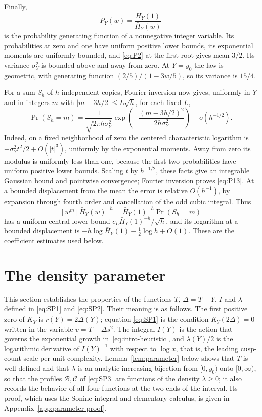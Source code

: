 Finally, \begin{equation}
P_Y(w)=\frac{\bar H_Y(1)}{\bar H_Y(w)}              \label{eq:P12}
\end{equation} is the probability generating function of a nonnegative integer
variable. Its probabilities at zero and one have uniform positive lower
bounds, its exponential moments are uniformly bounded, and \eqref{eq:P2} at the
first root gives mean \(3/2\). Its variance \(\sigma_Y^2\) is bounded
above and away from zero. At \(Y=y_0\) the law is geometric, with
generating function \((2/5)/(1-3w/5)\), so its variance is \(15/4\).

For a sum \(S_h\) of \(h\) independent copies, Fourier inversion now
gives, uniformly in \(Y\) and in integers \(m\) with
\(|m-3h/2|\le L\sqrt h\), for each fixed \(L\), \begin{equation}
\Pr(S_h=m)=\frac1{\sqrt{2\pi h\sigma_Y^2}}
     \exp\!\left(-\frac{(m-3h/2)^2}{2h\sigma_Y^2}\right)
       +o(h^{-1/2}).                              \label{eq:P13}
\end{equation} Indeed, on a fixed neighborhood of zero the centered
characteristic logarithm is \(-\sigma_Y^2t^2/2+O(|t|^3)\), uniformly by
the exponential moments. Away from zero its modulus is uniformly less
than one, because the first two probabilities have uniform positive
lower bounds. Scaling \(t\) by \(h^{-1/2}\), these facts give an
integrable Gaussian bound and pointwise convergence; Fourier inversion
proves \eqref{eq:P13}. At a bounded displacement from the mean the error is
relative \(O(h^{-1})\), by expansion through fourth order and
cancellation of the odd cubic integral. Thus \[
 [w^m]\bar H_Y(w)^{-h}
   =\bar H_Y(1)^{-h}\Pr(S_h=m)
\] has a uniform central lower bound \(c_L\bar H_Y(1)^{-h}/\sqrt h\),
and its logarithm at a bounded displacement is
\(-h\log\bar H_Y(1)-\tfrac12\log h+O(1)\). These are the coefficient
estimates used below.

\section{The density parameter}\label{the-stationary-parameter}

This section establishes the properties of the functions $T$,
$\Delta=T-Y$, $I$ and $\lambda$ defined in \eqref{eq:SP1} and
\eqref{eq:SP2}. Their meaning is as follows. The first positive zero of
$K_Y$ is $r(Y)=2\Delta(Y)$; equation \eqref{eq:SP1} is the condition
$K_Y(2\Delta)=0$ written in the variable $v=T-\Delta s^2$. The integral
$I(Y)$ is the action that governs the exponential growth
in~\eqref{eq:intro-heuristic}, and $\lambda(Y)/2$ is the logarithmic
derivative of $I(Y)^{-1}$ with respect to $\log x$, that is, the leading
cusp-count scale per unit complexity. Lemma~\ref{lem:parameter} below
shows that $T$ is well defined and that $\lambda$ is an analytic
increasing bijection from $[0,y_0)$ onto $[0,\infty)$, so that the
profiles $\mathcal B,\mathcal C$ of \eqref{eq:SP3} are functions of the
density $\lambda\ge0$; it also records the behavior of all four
functions at the two ends of the interval. Its proof, which uses the
Sonine integral and elementary calculus, is given in
Appendix~\ref{app:parameter-proof}.

